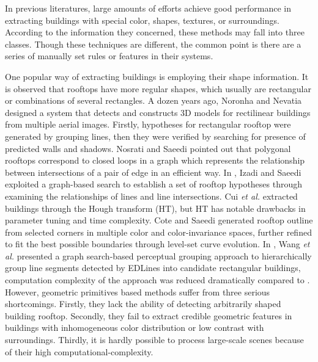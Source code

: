 \documentclass[runningheads]{llncs}
\begin{document}

   In previous literatures, large amounts of efforts achieve good performance in extracting buildings with special color, shapes, textures, or surroundings. According to the information they concerned, these methods may fall into three classes. Though these techniques are different, the common point is there are a series of manually set rules or features in their systems.
   
   One popular way of extracting buildings is employing their shape information. It is observed that rooftops have more regular shapes, which usually are rectangular or combinations of several rectangles. A dozen years ago, Noronha and Nevatia \cite{noronha2001detection} designed a system that detects and constructs 3D models for rectilinear buildings from multiple aerial images. Firstly, hypotheses for rectangular rooftop were generated by grouping lines, then they were verified by searching for presence of predicted walls and shadows. Nosrati and Saeedi \cite{nosrati2009novel} pointed out that polygonal rooftops correspond to closed loops in a graph which represents the relationship between intersections of a pair of edge in an efficient way. In \cite{izadi2012three}, Izadi and Saeedi exploited a graph-based search to establish a set of rooftop hypotheses through examining the relationships of lines and line intersections. Cui \textit{et al.} \cite{cui2012complex} extracted buildings through the Hough transform (HT), but HT has notable drawbacks in parameter tuning and time complexity. Cote and Saeedi \cite{cote2013automatic} generated rooftop outline from selected corners in  multiple color and color-invariance spaces, further refined to fit the best possible boundaries through level-set curve evolution. In \cite{wang2015efficient}, Wang \textit{et al.}  presented a graph search-based perceptual grouping approach to hierarchically group line segments detected by EDLines \cite{akinlar2011edlines} into candidate rectangular buildings, computation complexity of the approach was reduced dramatically compared to \cite{noronha2001detection} \cite{izadi2012three} \cite{cote2013automatic} \cite{mayunga2007semi}. However, geometric primitives based methods suffer from three serious shortcomings. Firstly, they lack the ability of detecting arbitrarily shaped building rooftop. Secondly, they fail to  extract credible geometric features in buildings with inhomogeneous color distribution or low contrast with surroundings. Thirdly, it is hardly possible to process large-scale scenes because of their high computational-complexity.	
	
\end{document}
